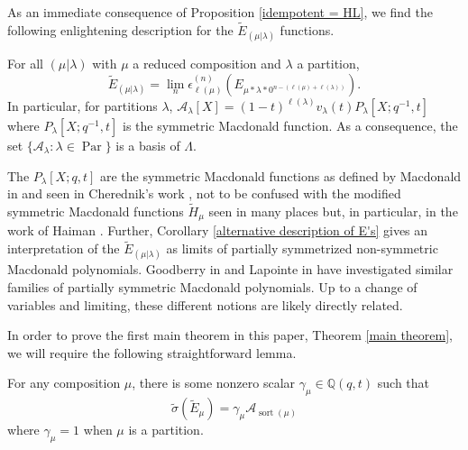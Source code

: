 \documentclass[ALCO,Unicode]{cedram}
\DeclareMathOperator{\sort}{sort}
\DeclareMathOperator{\Par}{\mathrm{Par}}
\begin{document}
As an immediate consequence of Proposition \ref{idempotent = HL}, we find the following enlightening description for the $\widetilde{E}_{(\mu|\lambda)}$ functions.

\begin{coro}\label{alternative description of E's}\label{A lambdas are basis}
    For all $(\mu|\lambda)$ with $\mu$ a reduced composition and $\lambda$ a partition,
    \begin{equation}
        \widetilde{E}_{(\mu|\lambda)} = \lim_{n} \epsilon_{\ell(\mu)}^{(n)}(E_{\mu*\lambda*0^{n-(\ell(\mu)+\ell(\lambda))}}).
    \end{equation}
    In particular, for partitions $\lambda$, $\mathcal{A}_{\lambda}[X] = (1-t)^{\ell(\lambda)} v_{\lambda}(t)P_{\lambda}[X;q^{-1},t]$ where $P_{\lambda}[X;q^{-1},t]$ is the symmetric Macdonald function. As a consequence, the set $\{ \mathcal{A}_{\lambda} : \lambda \in \Par \}$ is a basis of $\Lambda$.
\end{coro}

\begin{rema}
    The $P_{\lambda}[X;q,t]$ are the symmetric Macdonald functions as defined by Macdonald in \cite[Chapter 4, Section 4, (4.7)]{Macdonald} and seen in Cherednik's work \cite{C_2003}, not to be confused with the modified symmetric Macdonald functions $\widetilde{H}_{\mu}$ seen in many places but, in particular, in the work of Haiman \cite{HVanish}. Further, Corollary \ref{alternative description of E's} gives an interpretation of the $\widetilde{E}_{(\mu|\lambda)}$ as limits of partially symmetrized non-symmetric Macdonald polynomials. Goodberry in \cite{Goodberry} and Lapointe in \cite{lapointe2022msymmetric} have investigated similar families of partially symmetric Macdonald polynomials. Up to a change of variables and limiting, these different notions are likely directly related. 
\end{rema}

In order to prove the first main theorem in this paper, Theorem \ref{main theorem}, we will require the following straightforward lemma. 

\begin{lemm} \label{permuting and A lambdas}
For any composition $\mu$, there is some nonzero scalar $\gamma_{\mu} \in \mathbb{Q}(q,t)$ such that 
$$ \widetilde{\sigma}( \widetilde{E}_{\mu} ) = \gamma_{\mu} \mathcal{A}_{\sort(\mu)} $$
where $\gamma_{\mu} = 1$ when $\mu$ is a partition.
\end{lemm}
\end{document}
